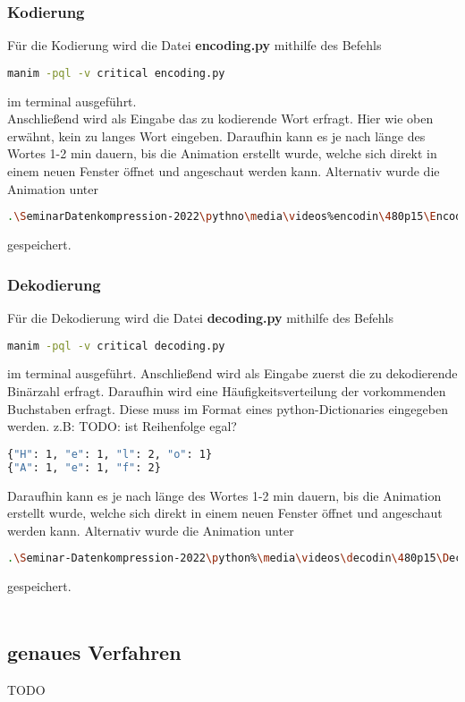 \documentclass[a4paper]{article}
\theoremstyle{definition}
\theoremstyle{remark}
\begin{document}
\subsubsection{Kodierung}
Für die Kodierung wird die Datei \textbf{encoding.py} mithilfe des Befehls
\begin{lstlisting}[language=bash,
numbers=none]
manim -pql -v critical encoding.py
\end{lstlisting}
im terminal ausgeführt.
\\
Anschließend wird als Eingabe das zu kodierende Wort erfragt. Hier wie oben erwähnt, kein zu langes Wort eingeben.
Daraufhin kann es je nach länge des Wortes 1-2 min dauern, bis die Animation erstellt
wurde, welche sich direkt in einem neuen Fenster öffnet und angeschaut werden kann.
Alternativ wurde die Animation unter
\begin{lstlisting}[language=bash, numbers=none]
.\SeminarDatenkompression-2022\pythno\media\videos%encodin\480p15\Encoding.mp4
\end{lstlisting}
gespeichert.
\subsubsection{Dekodierung}
Für die Dekodierung wird die Datei \textbf{decoding.py} mithilfe des Befehls
\begin{lstlisting}[language=bash,
numbers=none]
manim -pql -v critical decoding.py
\end{lstlisting}
im terminal ausgeführt.
Anschließend wird als Eingabe zuerst die zu dekodierende Binärzahl
erfragt. Daraufhin wird eine Häufigkeitsverteilung der vorkommenden Buchstaben erfragt.
Diese muss im Format eines python-Dictionaries eingegeben werden.
z.B: TODO: ist Reihenfolge egal?
\begin{lstlisting}[language=bash,
numbers=none]
{"H": 1, "e": 1, "l": 2, "o": 1}
{"A": 1, "e": 1, "f": 2}
\end{lstlisting}
Daraufhin kann es je nach länge des Wortes 1-2 min dauern, bis die Animation erstellt
wurde, welche sich direkt in einem neuen Fenster öffnet und angeschaut werden kann.
Alternativ wurde die Animation unter
\begin{lstlisting}[language=bash,
numbers=none]
.\Seminar-Datenkompression-2022\python%\media\videos\decodin\480p15\Decoding.mp4
\end{lstlisting}
gespeichert.
\\
\\
\subsection{genaues Verfahren}
TODO
	
\end{document}

